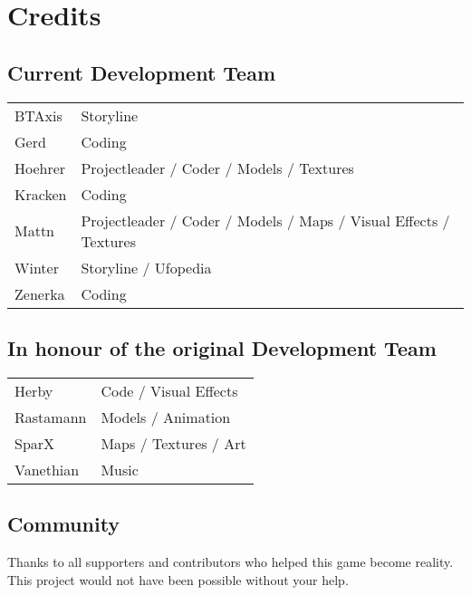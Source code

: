 \section{Credits}

\subsection{Current Development Team}
\begin{tabular}{l | l}
BTAxis & Storyline \\
Gerd & Coding \\
Hoehrer & Projectleader / Coder / Models / Textures \\
Kracken & Coding \\
Mattn & Projectleader / Coder / Models / Maps / Visual Effects / Textures \\
Winter & Storyline / Ufopedia \\
Zenerka & Coding
\end{tabular} 

\subsection{In honour of the original Development Team}
\begin{tabular}{l | l}
Herby & Code / Visual Effects\\ 
Rastamann & Models / Animation\\ 
SparX & Maps / Textures / Art\\ 
Vanethian & Music\\ 
\end{tabular} 

\subsection{Community}
Thanks to all supporters and contributors who helped this game become reality. This project would not have been possible without your help.
